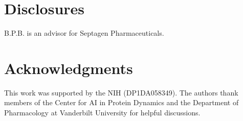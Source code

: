 \documentclass[journal=jctcce,manuscript=article,layout=twocolumn,hyperref=true]{achemso}
\begin{document}
	\section{Disclosures}
	
	B.P.B. is an advisor for Septagen Pharmaceuticals.
	
	\section*{Acknowledgments}
	This work was supported by the NIH (DP1DA058349). The authors thank members of the Center for AI in Protein Dynamics and the Department of Pharmacology at Vanderbilt University for helpful discussions.
	
	
	
\end{document}
